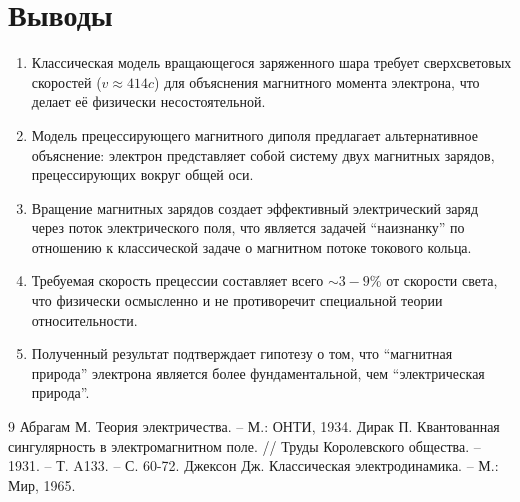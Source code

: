 \documentclass[12pt,a4paper]{article}
\begin{document}
\section{Выводы}

\begin{enumerate}
\item Классическая модель вращающегося заряженного шара требует сверхсветовых скоростей ($v \approx 414c$) для объяснения магнитного момента электрона, что делает её физически несостоятельной.

\item Модель прецессирующего магнитного диполя предлагает альтернативное объяснение: электрон представляет собой систему двух магнитных зарядов, прецессирующих вокруг общей оси.

\item Вращение магнитных зарядов создает эффективный электрический заряд через поток электрического поля, что является задачей ``наизнанку'' по отношению к классической задаче о магнитном потоке токового кольца.

\item Требуемая скорость прецессии составляет всего $\sim 3-9\%$ от скорости света, что физически осмысленно и не противоречит специальной теории относительности.

\item Полученный результат подтверждает гипотезу о том, что ``магнитная природа'' электрона является более фундаментальной, чем ``электрическая природа''.
\end{enumerate}

\begin{thebibliography}{9}
 Абрагам М. Теория электричества. -- М.: ОНТИ, 1934.
 Дирак П. Квантованная сингулярность в электромагнитном поле. // Труды Королевского общества. -- 1931. -- Т. A133. -- С. 60-72.
 Джексон Дж. Классическая электродинамика. -- М.: Мир, 1965.
\end{thebibliography}
\end{document}
